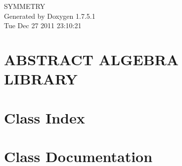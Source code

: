 \documentclass[a4paper]{book}
\begin{document}
\hypersetup{pageanchor=false,citecolor=blue}
\begin{titlepage}
\vspace*{7cm}
\begin{center}
{\Large \-S\-Y\-M\-M\-E\-T\-R\-Y }\\
\vspace*{1cm}
{\large \-Generated by Doxygen 1.7.5.1}\\
\vspace*{0.5cm}
{\small Tue Dec 27 2011 23:10:21}\\
\end{center}
\end{titlepage}
\clearemptydoublepage
{}
\tableofcontents
\clearemptydoublepage
{}
\hypersetup{pageanchor=true,citecolor=blue}
\chapter{\-A\-B\-S\-T\-R\-A\-C\-T \-A\-L\-G\-E\-B\-R\-A \-L\-I\-B\-R\-A\-R\-Y}
\label{index}\hypertarget{index}{}
\chapter{\-Class \-Index}

\chapter{\-Class \-Documentation}
























\printindex
\end{document}
